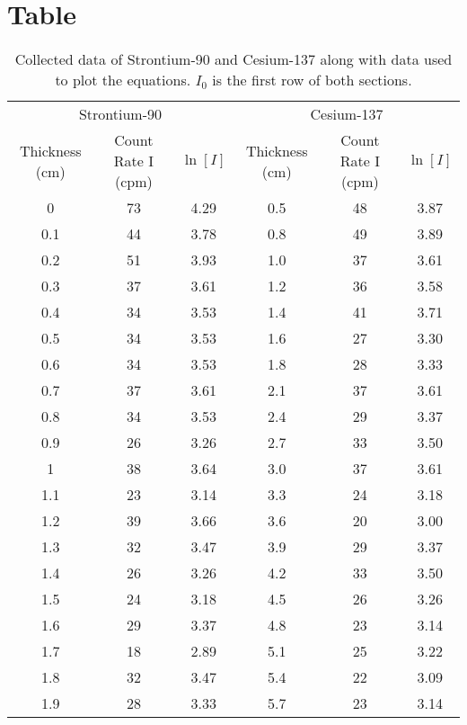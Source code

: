 \documentclass[12pt]{article}
\begin{document}
\section{Table}
\begin{table}[H]
    \centering
    \begin{tabular}{cccccc}
        \toprule
        \multicolumn{3}{c}{Strontium-90} & \multicolumn{3}{c}{Cesium-137} \\
        \cmidrule(lr){1-3} \cmidrule(lr){4-6}
        Thickness (cm) & Count Rate I (cpm) & $\ln[I]$ & Thickness (cm) & Count Rate I (cpm) & $\ln[I]$ \\
        \midrule
        0   & 73 & 4.29 & 0.5 & 48 & 3.87 \\
        0.1 & 44 & 3.78 & 0.8 & 49 & 3.89 \\
        0.2 & 51 & 3.93 & 1.0 & 37 & 3.61 \\
        0.3 & 37 & 3.61 & 1.2 & 36 & 3.58 \\
        0.4 & 34 & 3.53 & 1.4 & 41 & 3.71 \\
        0.5 & 34 & 3.53 & 1.6 & 27 & 3.30 \\
        0.6 & 34 & 3.53 & 1.8 & 28 & 3.33 \\
        0.7 & 37 & 3.61 & 2.1 & 37 & 3.61 \\
        0.8 & 34 & 3.53 & 2.4 & 29 & 3.37 \\
        0.9 & 26 & 3.26 & 2.7 & 33 & 3.50 \\
        1   & 38 & 3.64 & 3.0 & 37 & 3.61 \\
        1.1 & 23 & 3.14 & 3.3 & 24 & 3.18 \\
        1.2 & 39 & 3.66 & 3.6 & 20 & 3.00 \\
        1.3 & 32 & 3.47 & 3.9 & 29 & 3.37 \\
        1.4 & 26 & 3.26 & 4.2 & 33 & 3.50 \\
        1.5 & 24 & 3.18 & 4.5 & 26 & 3.26 \\
        1.6 & 29 & 3.37 & 4.8 & 23 & 3.14 \\
        1.7 & 18 & 2.89 & 5.1 & 25 & 3.22 \\
        1.8 & 32 & 3.47 & 5.4 & 22 & 3.09 \\
        1.9 & 28 & 3.33 & 5.7 & 23 & 3.14 \\
        \bottomrule
    \end{tabular}
    \caption{Collected data of Strontium-90 and Cesium-137 along with data used to plot the equations. $I_0$ is the first row of both sections.}
    \label{tab:count_rate_combined}
\end{table}
\end{document}
